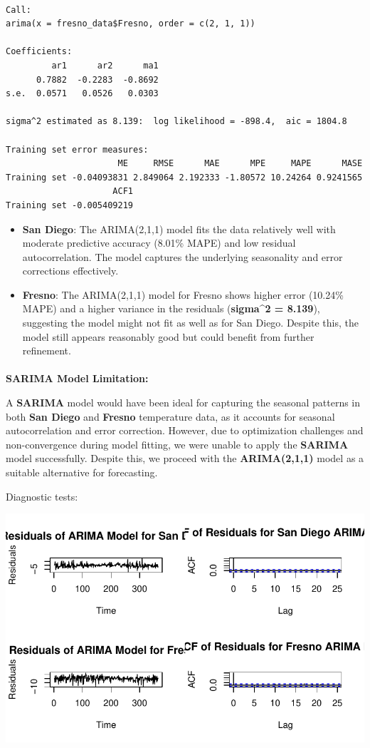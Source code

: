 \documentclass[
  11pt,
]{article}
\makeatletter
\let\oldparagraph\paragraph
\renewcommand{\paragraph}{
    \@ifstar
      \xxxParagraphStar
      \xxxParagraphNoStar
  }
\newcommand{\xxxParagraphStar}[1]{\oldparagraph*{#1}\mbox{}}
\newcommand{\xxxParagraphNoStar}[1]{\oldparagraph{#1}\mbox{}}
\makeatother
\begin{document}
\begin{verbatim}

Call:
arima(x = fresno_data$Fresno, order = c(2, 1, 1))

Coefficients:
         ar1      ar2      ma1
      0.7882  -0.2283  -0.8692
s.e.  0.0571   0.0526   0.0303

sigma^2 estimated as 8.139:  log likelihood = -898.4,  aic = 1804.8

Training set error measures:
                      ME     RMSE      MAE      MPE     MAPE      MASE
Training set -0.04093831 2.849064 2.192333 -1.80572 10.24264 0.9241565
                     ACF1
Training set -0.005409219
\end{verbatim}

\begin{itemize}
\item
  \textbf{San Diego}: The ARIMA(2,1,1) model fits the data relatively
  well with moderate predictive accuracy (8.01\% MAPE) and low residual
  autocorrelation. The model captures the underlying seasonality and
  error corrections effectively.
\item
  \textbf{Fresno}: The ARIMA(2,1,1) model for Fresno shows higher error
  (10.24\% MAPE) and a higher variance in the residuals
  (\textbf{sigma\^{}2 = 8.139}), suggesting the model might not fit as
  well as for San Diego. Despite this, the model still appears
  reasonably good but could benefit from further refinement.
\end{itemize}

\paragraph{\texorpdfstring{\textbf{SARIMA Model
Limitation:}}{SARIMA Model Limitation:}}\label{sarima-model-limitation}

A \textbf{SARIMA} model would have been ideal for capturing the seasonal
patterns in both \textbf{San Diego} and \textbf{Fresno} temperature
data, as it accounts for seasonal autocorrelation and error correction.
However, due to optimization challenges and non-convergence during model
fitting, we were unable to apply the \textbf{SARIMA} model successfully.
Despite this, we proceed with the \textbf{ARIMA(2,1,1)} model as a
suitable alternative for forecasting.

Diagnostic tests:

\includegraphics{project_files/figure-pdf/unnamed-chunk-89-1.pdf}
\end{document}
